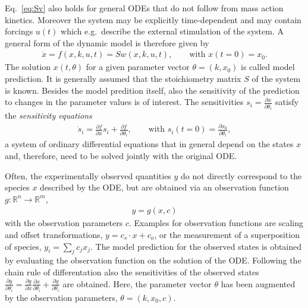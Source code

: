 \documentclass[article]{jss}
\begin{document}
Eq.~\eqref{eq:Sv} also holds for general ODEs that do not follow from mass action kinetics. Moreover the system may be explicitly time-dependent and may contain forcings $u(t)$ which e.g.~describe the external stimulation of the system. A general form of the dynamic model is therefore given by
\begin{align}
	\dot x = f(x,k,u,t) = S w(x,k,u,t), \quad\quad \textrm{with }  x(t = 0) = x_0.
\end{align}
The solution $x(t,\theta)$ for a given parameter vector $\theta = (k, x_0)$ is called model prediction. %
It is generally assumed that the stoichiometry matrix $S$ of the system is known.
Besides the model predition itself, also the sensitivity of the prediction to changes in the parameter values is of interest.
The sensitivities $s_i = \frac{\partial x}{\partial \theta_i}$ satisfy the \textit{sensitivity equations}
\begin{align}
	\dot s_i  = \frac{\partial f}{\partial x} s_i + \frac{\partial f}{\partial \theta_i}, \qquad \textrm{with }s_i(t = 0) = \frac{\partial x_0}{\partial \theta_i},
\end{align}
a system of ordinary differential equations that in general depend on the states $x$ and, therefore, need to be solved jointly with the original ODE.

Often, the experimentally observed quantities $y$ do not directly correspond to the species $x$ described by the ODE, but are obtained via an observation function $g: \mathbb{R}^n \rightarrow \mathbb{R}^m$,  \begin{align}
	y = g(x, c)
	\label{eq:observation}
\end{align}
with the observation parameters $c$. Examples for observation functions are scaling and offset transformations, $y = c_s \cdot x + c_o$, or the measurement of a superposition of species, $y_i = \sum_j c_j x_j$. The model prediction for the observed states is obtained by evaluating the observation function on the solution of the ODE. Following the chain rule of differentation also the sensitivities of the observed states $\frac{\partial y}{\partial \theta_i} = \frac{\partial g}{\partial x} \frac{\partial x}{\partial\theta_i}  + \frac{\partial g}{\partial \theta_i}$ are obtained. Here, the parameter vector $\theta$ has been augmented by the observation parameters, $\theta = (k, x_0, c)$.
\end{document}
